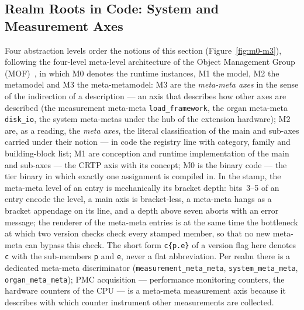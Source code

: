 \begin{nurlang}
\section{Realm Roots in Code: System and Measurement Axes}\label{sec:impl-system-axes}
Four abstraction levels order the notions of this section (Figure~\ref{fig:m0-m3}), following the
four-level meta-level architecture of the Object Management Group (MOF)~\cite{omg2016mof}, in which M0
denotes the runtime instances, M1 the model, M2 the metamodel and M3 the meta-metamodel: M3 are the
\emph{meta-meta axes} in the sense of the indirection of a description --- an axis that describes how
other axes are described (the measurement meta-meta \texttt{load\_framework}, the organ meta-meta
\texttt{disk\_io}, the system meta-metas under the hub of the extension hardware); M2 are, as a
reading, the \emph{meta axes}, the literal classification of the main and sub-axes carried under their
notion --- in code the registry line with category, family and building-block list; M1 are conception
and runtime implementation of the main and sub-axes --- the CRTP axis with its concept; M0 is the
binary code --- the tier binary in which exactly one assignment is compiled in. In the stamp, the
meta-meta level of an entry is mechanically its bracket depth: bits~3--5 of an entry encode the level,
a main axis is bracket-less, a meta-meta hangs as a bracket appendage on its line, and a depth above
seven aborts with an error message; the renderer of the meta-meta entries is at the same time the
bottleneck at which two version checks check every stamped member, so that no new meta-meta can bypass
this check. The short form \texttt{c\{p.e\}} of a version flag here denotes \texttt{c} with the
sub-members \texttt{p} and \texttt{e}, never a flat abbreviation. Per realm there is a dedicated
meta-meta discriminator (\texttt{measurement\_meta\_meta}, \texttt{system\_meta\_meta},
\texttt{organ\_meta\_meta}); PMC acquisition --- performance monitoring counters, the hardware counters
of the CPU --- is a meta-meta measurement axis because it describes with which counter instrument other
measurements are collected.
\begin{figure}[htbp]\centering
{}
\end{figure}
\end{nurlang}
